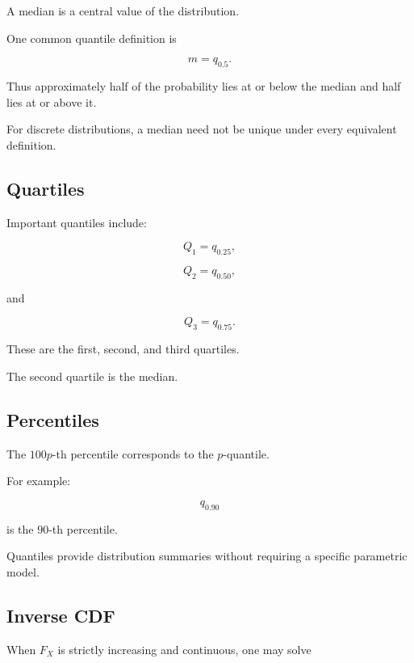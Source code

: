 A median is a central value of the distribution.

One common quantile definition is

\[
\boxed{
m
=
q_{0.5}.
}
\]

Thus approximately half of the probability lies at or below the median
and half lies at or above it.

For discrete distributions, a median need not be unique under every
equivalent definition.

\subsection{Quartiles}
\label{subsec:random-variable-quartiles}

Important quantiles include:

\[
\boxed{
Q_1=q_{0.25},
}
\]

\[
\boxed{
Q_2=q_{0.50},
}
\]

and

\[
\boxed{
Q_3=q_{0.75}.
}
\]

These are the first, second, and third quartiles.

The second quartile is the median.

\subsection{Percentiles}
\label{subsec:random-variable-percentiles}

The \(100p\)-th percentile corresponds to the \(p\)-quantile.

For example:

\[
q_{0.90}
\]

is the \(90\)-th percentile.

Quantiles provide distribution summaries without requiring a specific
parametric model.

\subsection{Inverse CDF}
\label{subsec:inverse-cdf}

When \(F_X\) is strictly increasing and continuous, one may solve

